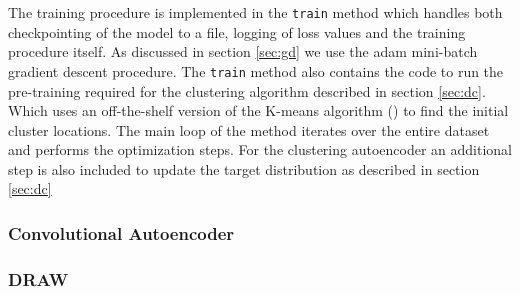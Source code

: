 The training procedure is implemented in the \lstinline{train} method which handles both checkpointing of the model to a file, logging of loss values and the training procedure itself. As discussed in section \ref{sec:gd} we use the adam mini-batch gradient descent procedure. The \lstinline{train} method also contains the code to run the pre-training required for the clustering algorithm described in section \ref{sec:dc}. Which uses an off-the-shelf version of the K-means algorithm () to find the initial cluster locations. The main loop of the method iterates over the entire dataset and performs the optimization steps. For the clustering autoencoder an additional step is also included to update the target distribution as described in section \ref{sec:dc}

\subsubsection*{Convolutional Autoencoder}\label{sec:convae_implement}


\subsubsection*{DRAW}\label{sec:draw_implement}